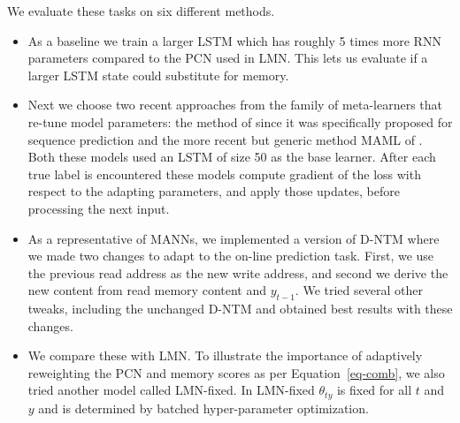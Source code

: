\documentclass[letterpaper]{article} %
\begin{document}
We evaluate these tasks on six different methods.
\begin{itemize}
\item
As a baseline we train a larger LSTM \cite{Hochreiter97lstm} which has roughly 5 times more RNN parameters compared to the PCN used in LMN.  This lets us evaluate if a larger LSTM state could substitute for memory.
\item
Next we choose two recent approaches from the family of meta-learners that re-tune model parameters: the method of \cite{Rei15} since it was specifically proposed for sequence prediction and the more recent but generic method MAML of \cite{Finn2017ModelAgnosticMF}. Both these models used an LSTM of size 50 as the base learner. After each true label is encountered these models compute gradient of the loss with respect to the adapting parameters, and apply those updates, before processing the next input.

\item
As a representative of MANNs, we implemented a version of D-NTM \cite{GulcehreCCB16} where we made two changes to adapt to the on-line prediction task. First, we use the previous read address as the new write address, and second we derive the new content from read memory content and $y_{t-1}$. We tried several other tweaks, including the unchanged D-NTM and obtained best results with these changes.

\item We compare these with LMN. To illustrate the importance of adaptively reweighting the PCN and memory scores as per Equation~\ref{eq-comb}, we also tried another model called LMN-fixed.  In LMN-fixed $\theta_{ty}$ is fixed for all $t$ and $y$ and is determined by batched hyper-parameter optimization.
\end{itemize}
\end{document}
